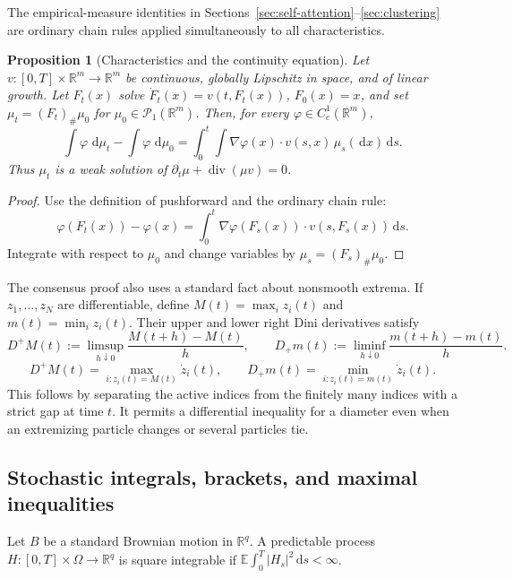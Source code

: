 \documentclass[11pt]{amsart}
\numberwithin{equation}{section}
\theoremstyle{plain}
\newtheorem{proposition}[theorem]{Proposition}
\newcommand{\R}{\mathbb{R}}
\newcommand{\E}{\mathbb{E}}
\newcommand{\cP}{\mathcal{P}}
\newcommand{\dd}{\,\mathrm{d}}
\newcommand{\abs}[1]{\left\lvert#1\right\rvert}
\DeclareMathOperator{\diver}{div}
\begin{document}
The empirical-measure identities in
Sections~\ref{sec:self-attention}--\ref{sec:clustering} are ordinary chain rules
applied simultaneously to all characteristics.

\begin{proposition}[Characteristics and the continuity equation]
\label{prop:appendix-characteristics}
Let $v:[0,T]\times\R^m\to\R^m$ be continuous, globally Lipschitz in space,
and of linear growth.  Let $F_t(x)$ solve
$\dot F_t(x)=v(t,F_t(x))$, $F_0(x)=x$, and set
$\mu_t=(F_t)_\#\mu_0$ for $\mu_0\in\cP_1(\R^m)$.  Then, for every
$\varphi\in C_c^1(\R^m)$,
\begin{equation}\label{eq:appendix-continuity-weak}
 \int\varphi\,\dd\mu_t-\int\varphi\,\dd\mu_0
 =\int_0^t\int\nabla\varphi(x)\cdot v(s,x)\,\mu_s(\dd x)\dd s.
\end{equation}
Thus $\mu_t$ is a weak solution of
$\partial_t\mu+\diver(\mu v)=0$.
\end{proposition}
\begin{proof}
Use the definition of pushforward and the ordinary chain rule:
\[
 \varphi(F_t(x))-\varphi(x)
 =\int_0^t\nabla\varphi(F_s(x))\cdot v(s,F_s(x))\dd s.
\]
Integrate with respect to $\mu_0$ and change variables by
$\mu_s=(F_s)_\#\mu_0$.
\end{proof}

The consensus proof also uses a standard fact about nonsmooth extrema.  If
$z_1,\ldots,z_N$ are differentiable, define
$M(t)=\max_i z_i(t)$ and $m(t)=\min_i z_i(t)$.  Their upper and lower right
Dini derivatives satisfy
\[
 D^+M(t):=\limsup_{h\downarrow0}\frac{M(t+h)-M(t)}h,
 \qquad
 D_+m(t):=\liminf_{h\downarrow0}\frac{m(t+h)-m(t)}h.
\]
\begin{equation}\label{eq:appendix-dini-maximum}
 D^+M(t)=\max_{i:z_i(t)=M(t)}\dot z_i(t),
 \qquad
 D_+m(t)=\min_{i:z_i(t)=m(t)}\dot z_i(t).
\end{equation}
This follows by separating the active indices from the finitely many indices
with a strict gap at time $t$.  It permits a differential inequality for a
diameter even when an extremizing particle changes or several particles tie.

\subsection{Stochastic integrals, brackets, and maximal inequalities}

Let $B$ be a standard Brownian motion in $\R^q$.  A predictable process
$H:[0,T]\times\Omega\to\R^q$ is square integrable if
$\E\int_0^T\abs{H_s}^2\dd s<\infty$.
\end{document}
